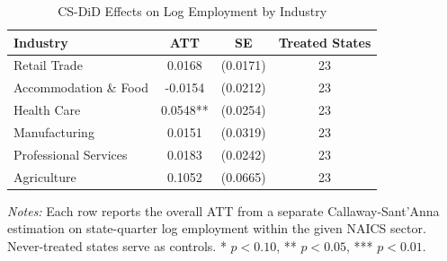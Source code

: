 \begin{table}[H]
\centering
\caption{CS-DiD Effects on Log Employment by Industry}
\begin{threeparttable}
\begin{tabular}{lccc}
\toprule
Industry & ATT & SE & Treated States \\
\midrule
Retail Trade & 0.0168 & (0.0171) & 23 \\
Accommodation \& Food & -0.0154 & (0.0212) & 23 \\
Health Care & 0.0548** & (0.0254) & 23 \\
Manufacturing & 0.0151 & (0.0319) & 23 \\
Professional Services & 0.0183 & (0.0242) & 23 \\
Agriculture & 0.1052 & (0.0665) & 23 \\
\bottomrule
\end{tabular}
\begin{tablenotes}[flushleft]
\small
\item \textit{Notes:} Each row reports the overall ATT from a separate Callaway-Sant'Anna estimation on state-quarter log employment within the given NAICS sector. Never-treated states serve as controls. * $p<0.10$, ** $p<0.05$, *** $p<0.01$.
\end{tablenotes}
\end{threeparttable}
\label{tab:industry}
\end{table}

